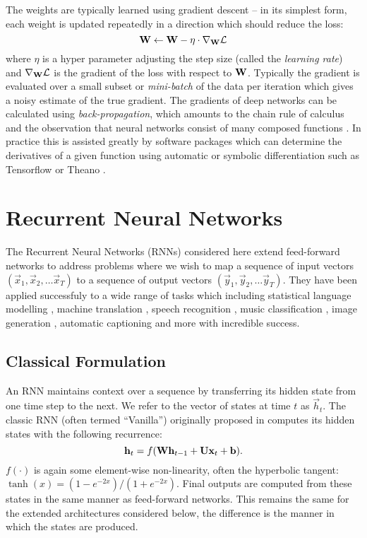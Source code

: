 The weights are typically learned using gradient descent -- in its simplest
form, each weight is updated repeatedly in a direction which should reduce the loss:
\begin{equation} \label{eq:graddescent}
	\mathbf{W} \gets \mathbf{W} - \eta \cdot \nabla_{\mathbf{W}}\mathcal{L}
\end{equation} where \(\eta\) is a hyper parameter adjusting the step size (called the
\emph{learning rate}) and \(\nabla_{\mathbf{W}}\mathcal{L}\) is the gradient of the loss with respect
to \(\mathbf{W}\). Typically the gradient is evaluated over a small subset or \emph{mini-batch}
 of the data per iteration which gives a noisy estimate of the true gradient.
The gradients of deep networks can be calculated using \emph{back-propagation}, which amounts
to the chain rule of calculus and the observation that neural networks consist of many
composed functions \autocite{Rumelhart1986}. In practice this is assisted greatly by software
packages which can determine the derivatives of a given function using automatic or symbolic
differentiation such as Tensorflow \autocite{Abadi2015} or Theano
 \autocite{TheTheanoDevelopmentTeam2016}.

\section{Recurrent Neural Networks}
The Recurrent Neural Networks (RNNs) considered here extend feed-forward networks to
address problems where we wish to map a sequence of input vectors
\((\vec{x}_1, \vec{x}_2, \dots \vec{x}_T) \) to a sequence of output vectors
\((\vec{y}_1, \vec{y}_2, \dots \vec{y}_T) \). They have been applied successfuly to a
wide range of tasks which including statistical language modelling
\autocite{Mikolov2012}, machine translation \autocite{Cho2014, Wu2016a}, speech 
recognition \autocite{Graves2006}, music classification \autocite{Choi2016},
image generation \autocite{Gregor2015}, automatic captioning \autocite{Vinyals2016, Xu2015}  and more
with incredible success.

\subsection{Classical Formulation}
An RNN maintains context over a sequence by transferring its hidden state from one
time step to the next. We refer to the vector of states at time \(t\) as \(\vec{h}_t\).
The classic RNN (often termed ``Vanilla'') originally proposed in \autocite{Elman1990}
computes its hidden states with the following recurrence:
\begin{equation}
	\mathbf{h}_t = f(\mathbf{W}\mathbf{h}_{t-1} + \mathbf{U}\mathbf{x}_t +  \mathbf{b}).
\label{eq:vanillarnn}
\end{equation} \(f(\cdot)\) is again some element-wise non-linearity, often the hyperbolic tangent:
\(\tanh(x) = (1 - e^{-2x}) / (1 + e^{-2x})\). Final outputs are computed from these
states in the same manner as feed-forward networks. This remains the same for the
extended architectures considered below, the difference is the manner in which the states
are produced.

